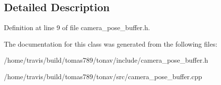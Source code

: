 \subsection{Detailed Description}


Definition at line 9 of file camera\-\_\-pose\-\_\-buffer.\-h.



The documentation for this class was generated from the following files\-:\begin{DoxyCompactItemize}
\item 
/home/travis/build/tomas789/tonav/include/camera\-\_\-pose\-\_\-buffer.\-h\item 
/home/travis/build/tomas789/tonav/src/camera\-\_\-pose\-\_\-buffer.\-cpp\end{DoxyCompactItemize}
